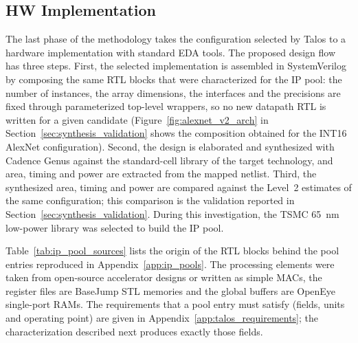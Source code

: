 \subsection{HW Implementation}
\label{subsec:hw_implementation}
The last phase of the methodology takes the configuration selected by
Talos to a hardware implementation with standard EDA tools. The
proposed design flow has three steps. First, the selected
implementation is assembled in SystemVerilog by composing the same RTL
blocks that were characterized for the IP pool: the number of
instances, the array dimensions, the interfaces and the precisions are
fixed through parameterized top-level wrappers, so no new datapath RTL
is written for a given candidate (Figure~\ref{fig:alexnet_v2_arch} in
Section~\ref{sec:synthesis_validation} shows the composition obtained
for the INT16 AlexNet configuration). Second, the design is elaborated and
synthesized with Cadence Genus against the standard-cell library of the
target technology, and area, timing and power are extracted from the
mapped netlist. Third, the synthesized area, timing and power are
compared against the Level~2 estimates of the same configuration; this
comparison is the validation reported in
Section~\ref{sec:synthesis_validation}. During this investigation, the
TSMC 65~nm low-power library was selected to build the IP pool.

Table~\ref{tab:ip_pool_sources} lists the origin of the RTL blocks
behind the pool entries reproduced in Appendix~\ref{app:ip_pools}. The
processing elements were taken from open-source accelerator designs or
written as simple MACs, the register files are BaseJump STL memories
and the global buffers are OpenEye single-port RAMs. The requirements
that a pool entry must satisfy (fields, units and operating point) are
given in Appendix~\ref{app:talos_requirements}; the characterization
described next produces exactly those fields.

